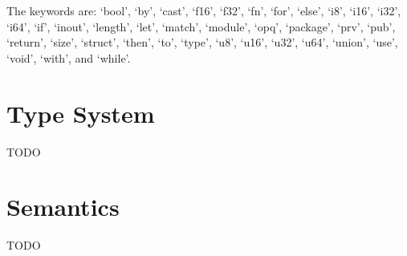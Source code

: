\documentclass[letterpaper]{article}
\begin{document}
%
The keywords are: `bool', `by', `cast', `f16', `f32', `fn', `for', `else', `i8', `i16', `i32', `i64', `if', `inout', `length', `let', `match', `module', `opq', `package', `prv', `pub', `return', `size', `struct', `then', `to', `type', `u8', `u16', `u32', `u64', `union', `use', `void', `with', and `while'.

\section{Type System}\label{sec:types}
TODO

\section{Semantics}\label{sec:semantics}
TODO
\end{document}
